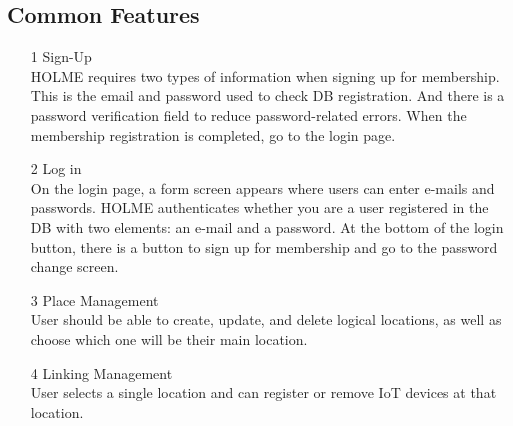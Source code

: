 \documentclass[conference]{IEEEtran}
\begin{document}
\subsection{Common Features}
\begin{enumerate}
\item[1] Sign-Up \\ 
HOLME requires two types of information when signing up for membership. This is the email and password used to check DB registration. And there is a password verification field to reduce password-related errors. When the membership registration is completed, go to the login page. \\
\item[2] Log in\\
On the login page, a form screen appears where users can enter e-mails and passwords. HOLME authenticates whether you are a user registered in the DB with two elements: an e-mail and a password. At the bottom of the login button, there is a button to sign up for membership and go to the password change screen.
\\
\item[3] Place Management\\
User should be able to create, update, and delete logical locations, as well as choose which one will be their main location.
\\
\item[4] Linking Management\\
User selects a single location and can register or remove IoT devices at that location.

\end{enumerate}
\end{document}
